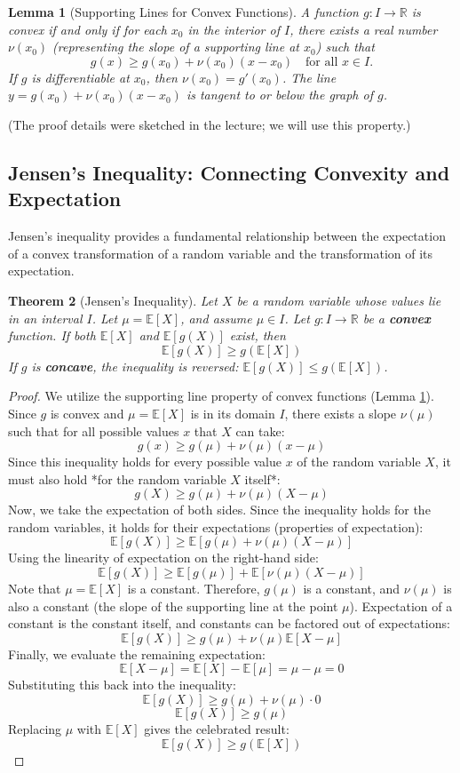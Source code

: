 \documentclass[11pt, letterpaper]{article}
\theoremstyle{plain} %
\newtheorem{theorem}{Theorem}[section]
\newtheorem{lemma}[theorem]{Lemma}
\theoremstyle{definition} %
\theoremstyle{remark} %
\newcommand{\E}{\mathbb{E}} %
\newcommand{\R}{\mathbb{R}} %
\begin{document}
\begin{lemma}[Supporting Lines for Convex Functions] \label{lem:support_line_convex}
A function $g: I \to \R$ is convex if and only if for each $x_0$ in the interior of $I$, there exists a real number $\nu(x_0)$ (representing the slope of a supporting line at $x_0$) such that
\[
g(x) \ge g(x_0) + \nu(x_0) (x - x_0) \quad \text{for all } x \in I.
\]
If $g$ is differentiable at $x_0$, then $\nu(x_0) = g'(x_0)$. The line $y = g(x_0) + \nu(x_0) (x - x_0)$ is tangent to or below the graph of $g$.
\end{lemma}
(The proof details were sketched in the lecture; we will use this property.)

\subsection{Jensen's Inequality: Connecting Convexity and Expectation}

Jensen's inequality provides a fundamental relationship between the expectation of a convex transformation of a random variable and the transformation of its expectation.

\begin{theorem}[Jensen's Inequality] \label{thm:jensen}
Let $X$ be a random variable whose values lie in an interval $I$. Let $\mu = \E[X]$, and assume $\mu \in I$. Let $g: I \to \R$ be a \textbf{convex} function. If both $\E[X]$ and $\E[g(X)]$ exist, then
\[
\E[g(X)] \ge g(\E[X])
\]
If $g$ is \textbf{concave}, the inequality is reversed: $\E[g(X)] \le g(\E[X])$.
\end{theorem}

\begin{proof}
We utilize the supporting line property of convex functions (Lemma \ref{lem:support_line_convex}). Since $g$ is convex and $\mu = \E[X]$ is in its domain $I$, there exists a slope $\nu(\mu)$ such that for all possible values $x$ that $X$ can take:
\[
g(x) \ge g(\mu) + \nu(\mu) (x - \mu)
\]
Since this inequality holds for every possible value $x$ of the random variable $X$, it must also hold *for the random variable $X$ itself*:
\[
g(X) \ge g(\mu) + \nu(\mu) (X - \mu)
\]
Now, we take the expectation of both sides. Since the inequality holds for the random variables, it holds for their expectations (properties of expectation):
\[
\E[g(X)] \ge \E[g(\mu) + \nu(\mu) (X - \mu)]
\]
Using the linearity of expectation on the right-hand side:
\[
\E[g(X)] \ge \E[g(\mu)] + \E[\nu(\mu) (X - \mu)]
\]
Note that $\mu = \E[X]$ is a constant. Therefore, $g(\mu)$ is a constant, and $\nu(\mu)$ is also a constant (the slope of the supporting line at the point $\mu$). Expectation of a constant is the constant itself, and constants can be factored out of expectations:
\[
\E[g(X)] \ge g(\mu) + \nu(\mu) \E[X - \mu]
\]
Finally, we evaluate the remaining expectation:
\[
\E[X - \mu] = \E[X] - \E[\mu] = \mu - \mu = 0
\]
Substituting this back into the inequality:
\[
\E[g(X)] \ge g(\mu) + \nu(\mu) \cdot 0
\]
\[
\E[g(X)] \ge g(\mu)
\]
Replacing $\mu$ with $\E[X]$ gives the celebrated result:
\[
\E[g(X)] \ge g(\E[X])
\]
\end{proof}
\end{document}
